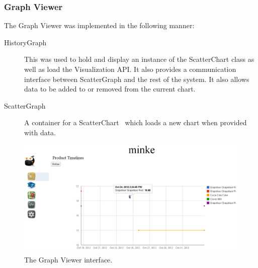 \subsubsection{Graph Viewer}
The Graph Viewer was implemented in the following manner:
\begin{description}
\item[HistoryGraph] This was used to hold and display an instance of the
ScatterChart class as well as load the Visualization API. It also
provides a communication interface between ScatterGraph and the rest of the
system. It also allows data to be added to or removed from the current chart.
\item[ScatterGraph] A container for a ScatterChart~\cite{scatter} which loads a new chart when provided with data.
\end{description}
\begin{figure}[h!]
\centering
\includegraphics[width=1.0\textwidth]{gwt-graph.png}
\caption{The Graph Viewer interface.}
\end{figure}